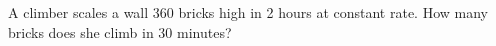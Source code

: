 A climber scales a wall 360 bricks high in 2 hours at constant rate. How many bricks does she climb in 30 minutes?
